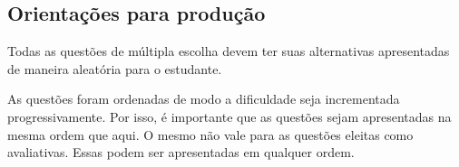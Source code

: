 \subsection*{Orientações para produção}

\begin{compactitem}
	\item Todas as questões de múltipla escolha devem ter suas alternativas apresentadas de maneira aleatória para o estudante.
	\item As questões foram ordenadas de modo a dificuldade seja incrementada progressivamente.
	Por isso, é importante que as questões sejam apresentadas na mesma ordem que aqui.
	O mesmo não vale para as questões eleitas como avaliativas.
	Essas podem ser apresentadas em qualquer ordem.
\end{compactitem}